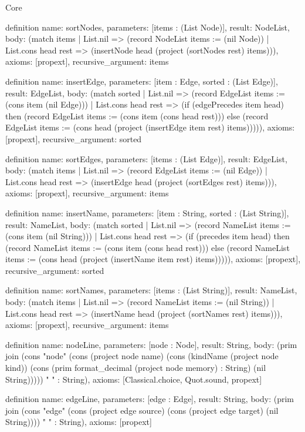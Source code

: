 \begin{lexlean}{Core}
\begin{semanticmodule}
definition{
  name: sortNodes,
  parameters: [items : (List Node)],
  result: NodeList,
  body: (match items
    | List.nil => (record NodeList {items := (nil Node)})
    | List.cons head rest => (insertNode head (project (sortNodes rest) items))),
  axioms: [propext],
  recursive_argument: items
}

definition{
  name: insertEdge,
  parameters: [item : Edge, sorted : (List Edge)],
  result: EdgeList,
  body: (match sorted
    | List.nil => (record EdgeList {items := (cons item (nil Edge))})
    | List.cons head rest => (if (edgePrecedes item head) then (record EdgeList {items := (cons item (cons head rest))}) else (record EdgeList {items := (cons head (project (insertEdge item rest) items))}))),
  axioms: [propext],
  recursive_argument: sorted
}

definition{
  name: sortEdges,
  parameters: [items : (List Edge)],
  result: EdgeList,
  body: (match items
    | List.nil => (record EdgeList {items := (nil Edge)})
    | List.cons head rest => (insertEdge head (project (sortEdges rest) items))),
  axioms: [propext],
  recursive_argument: items
}

definition{
  name: insertName,
  parameters: [item : String, sorted : (List String)],
  result: NameList,
  body: (match sorted
    | List.nil => (record NameList {items := (cons item (nil String))})
    | List.cons head rest => (if (precedes item head) then (record NameList {items := (cons item (cons head rest))}) else (record NameList {items := (cons head (project (insertName item rest) items))}))),
  axioms: [propext],
  recursive_argument: sorted
}

definition{
  name: sortNames,
  parameters: [items : (List String)],
  result: NameList,
  body: (match items
    | List.nil => (record NameList {items := (nil String)})
    | List.cons head rest => (insertName head (project (sortNames rest) items))),
  axioms: [propext],
  recursive_argument: items
}

definition{
  name: nodeLine,
  parameters: [node : Node],
  result: String,
  body: (prim join (cons "node" (cons (project node name) (cons (kindName (project node kind)) (cons (prim format_decimal (project node memory) : String) (nil String))))) " " : String),
  axioms: [Classical.choice, Quot.sound, propext]
}

definition{
  name: edgeLine,
  parameters: [edge : Edge],
  result: String,
  body: (prim join (cons "edge" (cons (project edge source) (cons (project edge target) (nil String)))) " " : String),
  axioms: [propext]
}


\end{semanticmodule}
\end{lexlean}
